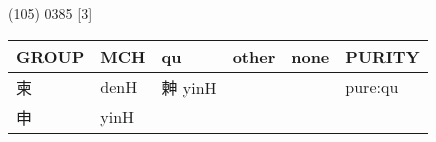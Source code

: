 \documentclass[14pt,a4paper]{scrartcl}
\begin{document}
(105) 0385 {[}3{]}

\begin{longtable}[c]{@{}llllll@{}}
\toprule
\begin{minipage}[b]{0.14\columnwidth}\raggedright\strut
GROUP
\strut\end{minipage} &
\begin{minipage}[b]{0.14\columnwidth}\raggedright\strut
MCH
\strut\end{minipage} &
\begin{minipage}[b]{0.14\columnwidth}\raggedright\strut
qu
\strut\end{minipage} &
\begin{minipage}[b]{0.14\columnwidth}\raggedright\strut
other
\strut\end{minipage} &
\begin{minipage}[b]{0.14\columnwidth}\raggedright\strut
none
\strut\end{minipage} &
\begin{minipage}[b]{0.14\columnwidth}\raggedright\strut
PURITY
\strut\end{minipage}\tabularnewline
\midrule
\endhead
\begin{minipage}[t]{0.14\columnwidth}\raggedright\strut
柬
\strut\end{minipage} &
\begin{minipage}[t]{0.14\columnwidth}\raggedright\strut
denH
\strut\end{minipage} &
\begin{minipage}[t]{0.14\columnwidth}\raggedright\strut
𣍃 yinH
\strut\end{minipage} &
\begin{minipage}[t]{0.14\columnwidth}\raggedright\strut
\strut\end{minipage} &
\begin{minipage}[t]{0.14\columnwidth}\raggedright\strut
\strut\end{minipage} &
\begin{minipage}[t]{0.14\columnwidth}\raggedright\strut
pure:qu
\strut\end{minipage}\tabularnewline
\begin{minipage}[t]{0.14\columnwidth}\raggedright\strut
申
\strut\end{minipage} &
\begin{minipage}[t]{0.14\columnwidth}\raggedright\strut
yinH
\strut\end{minipage} &
\begin{minipage}[t]{0.14\columnwidth}\raggedright\strut
\strut\end{minipage} &

\end{longtable}
\end{document}
